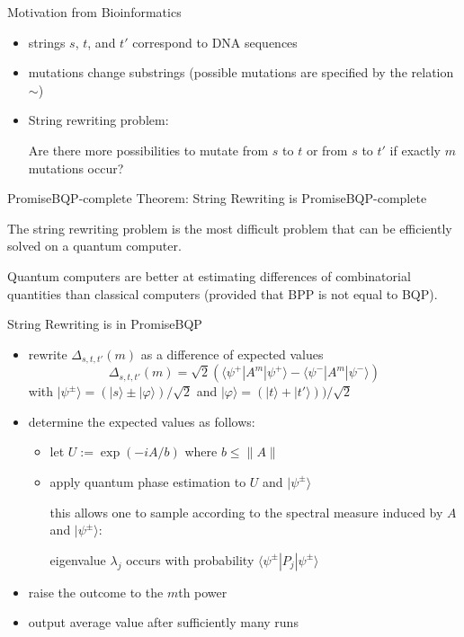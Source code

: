 \documentclass[slideColor]{prosper}
\renewcommand{\>}{\rangle}
\newcommand{\<}{\langle}
\begin{document}

\begin{slide}{Motivation from Bioinformatics}
\begin{itemize}
\item strings $s$, $t$, and $t'$ correspond to DNA sequences 
\item mutations change substrings (possible mutations are specified by the relation $\sim$)
\item String rewriting problem:

Are there more possibilities to mutate from $s$ to $t$ or from $s$ to $t'$ if exactly $m$ mutations occur?
\end{itemize}
\end{slide}


\begin{slide}{PromiseBQP-complete}
Theorem: String Rewriting is PromiseBQP-complete

\bigskip
The string rewriting problem is the most difficult problem that can be efficiently solved on a quantum computer.

\bigskip
Quantum computers are better at estimating differences of combinatorial quantities than classical computers (provided that BPP is not equal to BQP).
\end{slide}


\begin{slide}{String Rewriting is in PromiseBQP}

\begin{itemize}
\item rewrite $\Delta_{s,t,t'}(m)$ as a difference of expected values
\[
\Delta_{s,t,t'}(m)=\sqrt{2}(\<\psi^+|A^m|\psi^+\> - \<\psi^-|A^m|\psi^-\>)
\]
with $|\psi^{\pm}\>=(|s\>\pm|\varphi\>)/\sqrt{2}$ and $|\varphi\>=(|t\>+|t'\>))/\sqrt{2}$
\item determine the expected values as follows:
\begin{itemize}
\item let $U:=\exp(-i A/b)$ where $b\le\|A\|$
\item apply quantum phase estimation to $U$ and $|\psi^{\pm}\>$

\medskip
this allows one to sample according to the spectral measure induced by $A$ and $|\psi^{\pm}\>$: 

eigenvalue $\lambda_j$ occurs with probability  $\<\psi^{\pm}|P_j|\psi^{\pm}\>$
\end{itemize}
\item raise the outcome to the $m$th power
\item output average value after sufficiently many runs 
\end{itemize}
\end{slide}
\end{document}
